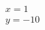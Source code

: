 \documentclass{article}
\begin{document}
\begin{gather}
	  x = 1 \\
	  y = -10
\end{gather}
\end{document}

